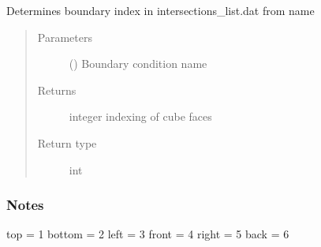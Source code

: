 \documentclass[letterpaper,10pt,english]{sphinxmanual}
\begin{document}
\begin{fulllineitems}
\label{\detokenize{pydfnworks:pydfnworks.dfnGraph.dfn2graph.boundary_index}}
Determines boundary index in intersections\_list.dat from name
\begin{quote}\begin{description}
\item[{Parameters}] \leavevmode
{} () \textendash{} Boundary condition name

\item[{Returns}] \leavevmode
{} \textendash{} integer indexing of cube faces

\item[{Return type}] \leavevmode
int

\end{description}\end{quote}
\subsubsection*{Notes}

top = 1
bottom = 2
left = 3
front = 4
right = 5
back = 6

\end{fulllineitems}

\end{document}

